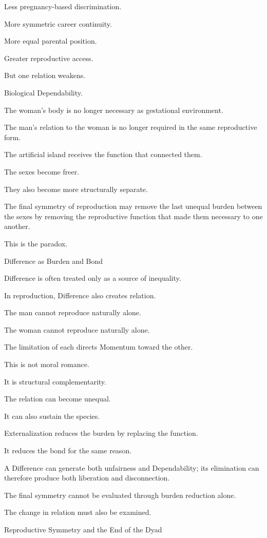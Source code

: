 Less pregnancy-based discrimination.

More symmetric career continuity.

More equal parental position.

Greater reproductive access.

But one relation weakens.

Biological Dependability.

The woman’s body is no longer necessary as gestational environment.

The man’s relation to the woman is no longer required in the same reproductive form.

The artificial island receives the function that connected them.

The sexes become freer.

They also become more structurally separate.

The final symmetry of reproduction may remove the last unequal burden between the sexes by removing the reproductive function that made them necessary to one another.

This is the paradox.

Difference as Burden and Bond

Difference is often treated only as a source of inequality.

In reproduction, Difference also creates relation.

The man cannot reproduce naturally alone.

The woman cannot reproduce naturally alone.

The limitation of each directs Momentum toward the other.

This is not moral romance.

It is structural complementarity.

The relation can become unequal.

It can also sustain the species.

Externalization reduces the burden by replacing the function.

It reduces the bond for the same reason.

A Difference can generate both unfairness and Dependability; its elimination can therefore produce both liberation and disconnection.

The final symmetry cannot be evaluated through burden reduction alone.

The change in relation must also be examined.

Reproductive Symmetry and the End of the Dyad

